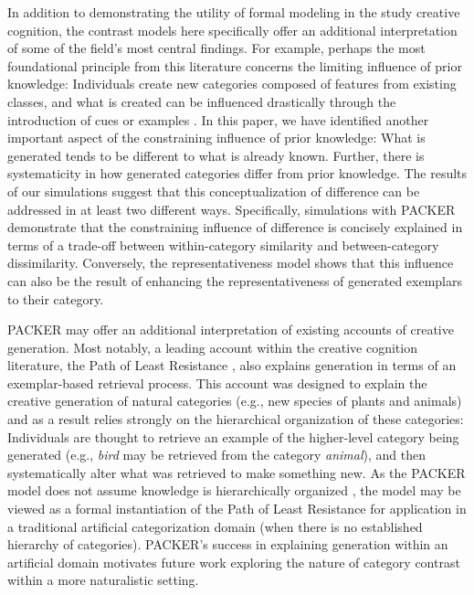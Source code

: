 \documentclass[12pt]{article}
\begin{document}
\begin{flushleft}
In addition to demonstrating the utility of formal modeling in the study
creative cognition, the contrast models here specifically offer an additional
interpretation of some of the field's most central findings. For example,
perhaps the most foundational principle from this literature concerns the
limiting influence of prior knowledge: Individuals create new categories
composed of features from existing classes, and what is created can be
influenced drastically through the introduction of cues or examples
\citep{marsh1999inadvertent,smith1993constraining}. In this paper, we have
identified another important aspect of the constraining influence of prior
knowledge: What is generated tends to be different to what is already known.
Further, there is systematicity in how generated categories differ from prior
knowledge. The results of our simulations suggest that this conceptualization of
difference can be addressed in at least two different ways. Specifically,
simulations with PACKER demonstrate that the constraining influence of
difference is concisely explained in terms of a trade-off between
within-category similarity and between-category dissimilarity. Conversely, the
representativeness model shows that this influence can also be the result of
enhancing the representativeness of generated exemplars to their category.

PACKER may offer an additional interpretation of existing accounts of creative
generation. Most notably, a leading account within the creative cognition
literature, the Path of Least Resistance \citep{ward1994structured,ward1995s},
also explains generation in terms of an exemplar-based retrieval process. This
account was designed to explain the creative generation of natural categories
(e.g., new species of plants and animals) and as a result relies strongly on the
hierarchical organization of these categories: Individuals are thought to
retrieve an example of the higher-level category being generated (e.g.,
\textit{bird} may be retrieved from the category \textit{animal}), and then
systematically alter what was retrieved to make something new. As the PACKER
model does not assume knowledge is hierarchically organized \citep[this is true
of the exemplar view more broadly, see][]{murphy2016exemplar}, the model may be
viewed as a formal instantiation of the Path of Least Resistance for application
in a traditional artificial categorization domain (when there is no established
hierarchy of categories). PACKER's success in explaining generation within an
artificial domain motivates future work exploring the nature of category
contrast within a more naturalistic setting.


\end{flushleft}
\end{document}
